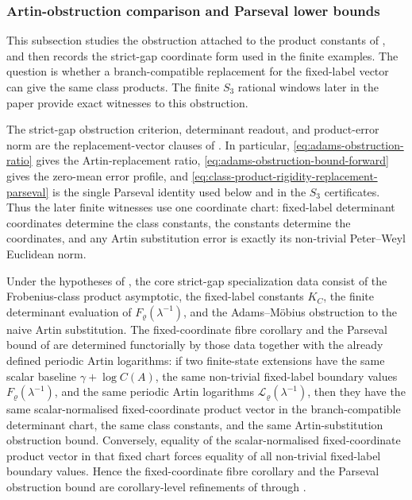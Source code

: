 \subsubsection{Artin-obstruction comparison and Parseval lower bounds}

This subsection studies the obstruction attached to the product constants of
,
and then records the strict-gap coordinate form used in the finite examples.
The question is whether a branch-compatible replacement for the fixed-label
vector can give the same class products.  The finite \(S_3\) rational windows
later in the paper provide exact witnesses to this obstruction.

The strict-gap obstruction criterion, determinant readout, and product-error
norm are the replacement-vector clauses of
.  In particular,
\eqref{eq:adams-obstruction-ratio} gives the Artin-replacement ratio,
\eqref{eq:adams-obstruction-bound-forward} gives the zero-mean error profile,
and \eqref{eq:class-product-rigidity-replacement-parseval} is the single Parseval identity
used below and in the \(S_3\) certificates.  Thus the later finite witnesses
use one coordinate chart: fixed-label determinant coordinates determine the
class constants, the constants determine the coordinates, and any Artin
substitution error is exactly its non-trivial Peter--Weyl Euclidean norm.

\begin{remark}
  Under the hypotheses of , the
  core strict-gap specialization data consist of the Frobenius-class product
  asymptotic, the fixed-label constants \(K_C\), the finite determinant
  evaluation of \(F_\varrho(\lambda^{-1})\), and the Adams--M\"obius
  obstruction to the naive Artin substitution.  The fixed-coordinate fibre corollary
   and the Parseval
  bound of  are determined functorially by
  those data together with the already defined periodic Artin logarithms:
  if two finite-state extensions have the same scalar baseline
  \(\gamma+\log C(A)\), the same non-trivial fixed-label boundary values
  \(F_\varrho(\lambda^{-1})\), and the same periodic Artin logarithms
  \(\mathcal L_\varrho(\lambda^{-1})\), then they have the same
  scalar-normalised fixed-coordinate product vector in the branch-compatible
  determinant chart, the same class constants, and the same
  Artin-substitution obstruction bound.  Conversely, equality of the
  scalar-normalised fixed-coordinate product vector in that fixed chart forces
  equality of all non-trivial fixed-label boundary values.  Hence the
  fixed-coordinate fibre corollary and the Parseval obstruction bound are
  corollary-level refinements of
   through
  .
\end{remark}

